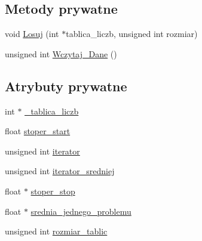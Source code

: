 \subsection*{Metody prywatne}
\begin{DoxyCompactItemize}
\item 
void \hyperlink{class_benchmark_a105f31cf198d96969b939e7bacaa9354}{Losuj} (int $\ast$tablica\_\-liczb, unsigned int rozmiar)
\item 
unsigned int \hyperlink{class_benchmark_aa514b55bb3d7c5eb4c1862dbdbc313b6}{Wczytaj\_\-Dane} ()
\end{DoxyCompactItemize}
\subsection*{Atrybuty prywatne}
\begin{DoxyCompactItemize}
\item 
int $\ast$ \hyperlink{class_benchmark_af550349e9f512c47bd5f4fd6f0630913}{\_\-tablica\_\-liczb}
\item 
float \hyperlink{class_benchmark_a9809e00b248161927de3cbd71fd8d424}{stoper\_\-start}
\item 
unsigned int \hyperlink{class_benchmark_ae1cbaa987a9ac13bc40dbe4b84a587b6}{iterator}
\item 
unsigned int \hyperlink{class_benchmark_a12925bcca68de983919ebd5d6b9e2b01}{iterator\_\-sredniej}
\item 
float $\ast$ \hyperlink{class_benchmark_aa33949783712cd5f501a32b4f497f8e9}{stoper\_\-stop}
\item 
float $\ast$ \hyperlink{class_benchmark_a1eea18c08dc325a4723ef0b2084938d6}{srednia\_\-jednego\_\-problemu}
\item 
unsigned int \hyperlink{class_benchmark_a30d4c478ec859f45df0ac80ac1a89203}{rozmiar\_\-tablic}
\end{DoxyCompactItemize}



